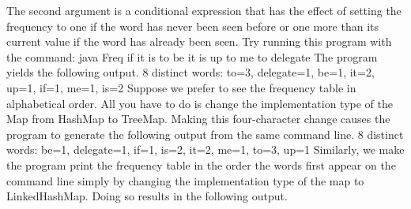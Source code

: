 \documentclass[oneside,a4paper,12pt]{report}
\begin{document}
The second argument is a conditional expression that has the effect of setting the frequency to one if the word has never been seen before or one more than its current value if the word has already been seen. Try running this program with the command:
java Freq if it is to be it is up to me to delegate
The program yields the following output.
8 distinct words: {to=3, delegate=1, be=1, it=2, up=1, if=1, me=1, is=2}
Suppose we prefer to see the frequency table in alphabetical order. All you have to do is change the implementation type of the Map from HashMap to TreeMap. Making this four-character change causes the program to generate the following output from the same command line.
8 distinct words: {be=1, delegate=1, if=1, is=2, it=2, me=1, to=3, up=1}
Similarly, we make the program print the frequency table in the order the words first appear on the command line simply by changing the implementation type of the map to LinkedHashMap. Doing so results in the following output.
\end{document}
